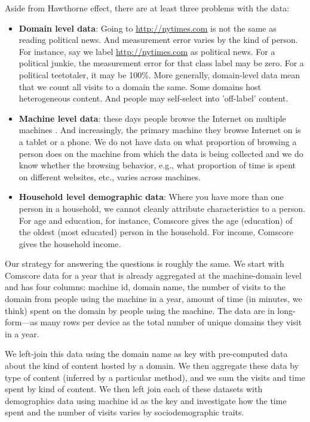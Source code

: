 \documentclass[12pt, letterpaper]{article}
\begin{document}
Aside from Hawthorne effect, there are at least three problems with the data:
\begin{itemize}
  \item \textbf{Domain level data}: Going to \url{http://nytimes.com} is not the same as reading political news. And measurement error varies by the kind of person. For instance, say we label \url{http://nytimes.com} as political news. For a political junkie, the measurement error for that class label may be zero. For a political teetotaler, it may be 100\%. More generally, domain-level data mean that we count all visits to a domain the same. Some domains host heterogeneous content. And people may self-select into 'off-label' content.

  \item \textbf{Machine level data}: these days people browse the Internet on multiple machines \citep{deloitte2019}. And increasingly, the primary machine they browse Internet on is a tablet or a phone. We do not have data on what proportion of browsing a person does on the machine from which the data is being collected and we do know whether the browsing behavior, e.g., what proportion of time is spent on different websites, etc., varies across machines.

  \item \textbf{Household level demographic data}: Where you have more than one person in a household, we cannot cleanly attribute characteristics to a person. For age and education, for instance, Comscore gives the age (education) of the oldest (most educated) person in the household. For income, Comscore gives the household income.
\end{itemize}

Our strategy for answering the questions is roughly the same. We start with Comscore data for a year that is already aggregated at the machine-domain level and has four columns: machine id, domain name, the number of visits to the domain from people using the machine in a year, amount of time (in minutes, we think) spent on the domain by people using the machine. The data are in long-form---as many rows per device as the total number of unique domains they visit in a year.

We left-join this data using the domain name as key with pre-computed data about the kind of content hosted by a domain. We then aggregate these data by type of content (inferred by a particular method), and we sum the visits and time spent by kind of content. We then left join each of these datasets with demographics data using machine id as the key and investigate how the time spent and the number of visits varies by sociodemographic traits.
\end{document}
